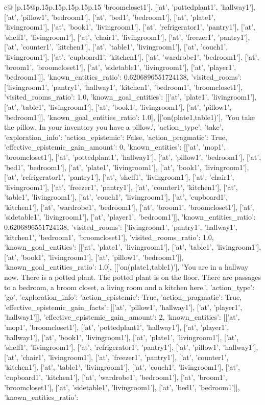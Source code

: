 \documentclass{article}
\begin{document}
{\begin{supertabular}{c@{$\;$}|p{.15\linewidth}@{}p{.15\linewidth}p{.15\linewidth}p{.15\linewidth}p{.15\linewidth}p{.15\linewidth}}
{{{'broomcloset1'], ['at', 'pottedplant1', 'hallway1'], ['at', 'pillow1', 'bedroom1'], ['at', 'bed1', 'bedroom1'], ['at', 'plate1', 'livingroom1'], ['at', 'book1', 'livingroom1'], ['at', 'refrigerator1', 'pantry1'], ['at', 'shelf1', 'livingroom1'], ['at', 'chair1', 'livingroom1'], ['at', 'freezer1', 'pantry1'], ['at', 'counter1', 'kitchen1'], ['at', 'table1', 'livingroom1'], ['at', 'couch1', 'livingroom1'], ['at', 'cupboard1', 'kitchen1'], ['at', 'wardrobe1', 'bedroom1'], ['at', 'broom1', 'broomcloset1'], ['at', 'sidetable1', 'livingroom1'], ['at', 'player1', 'bedroom1']], 'known_entities_ratio': 0.6206896551724138, 'visited_rooms': ['livingroom1', 'pantry1', 'hallway1', 'kitchen1', 'bedroom1', 'broomcloset1'], 'visited_rooms_ratio': 1.0, 'known_goal_entities': [['at', 'plate1', 'livingroom1'], ['at', 'table1', 'livingroom1'], ['at', 'book1', 'livingroom1'], ['at', 'pillow1', 'bedroom1']], 'known_goal_entities_ratio': 1.0}}], [['on(plate1,table1)'], 'You take the pillow. In your inventory you have a pillow.', {'action_type': 'take', 'exploration_info': {'action_epistemic': False, 'action_pragmatic': True, 'effective_epistemic_gain_amount': 0, 'known_entities': [['at', 'mop1', 'broomcloset1'], ['at', 'pottedplant1', 'hallway1'], ['at', 'pillow1', 'bedroom1'], ['at', 'bed1', 'bedroom1'], ['at', 'plate1', 'livingroom1'], ['at', 'book1', 'livingroom1'], ['at', 'refrigerator1', 'pantry1'], ['at', 'shelf1', 'livingroom1'], ['at', 'chair1', 'livingroom1'], ['at', 'freezer1', 'pantry1'], ['at', 'counter1', 'kitchen1'], ['at', 'table1', 'livingroom1'], ['at', 'couch1', 'livingroom1'], ['at', 'cupboard1', 'kitchen1'], ['at', 'wardrobe1', 'bedroom1'], ['at', 'broom1', 'broomcloset1'], ['at', 'sidetable1', 'livingroom1'], ['at', 'player1', 'bedroom1']], 'known_entities_ratio': 0.6206896551724138, 'visited_rooms': ['livingroom1', 'pantry1', 'hallway1', 'kitchen1', 'bedroom1', 'broomcloset1'], 'visited_rooms_ratio': 1.0, 'known_goal_entities': [['at', 'plate1', 'livingroom1'], ['at', 'table1', 'livingroom1'], ['at', 'book1', 'livingroom1'], ['at', 'pillow1', 'bedroom1']], 'known_goal_entities_ratio': 1.0}}], [['on(plate1,table1)'], 'You are in a hallway now. There is a potted plant. The potted plant is on the floor. There are passages to a bedroom, a broom closet, a living room and a kitchen here.', {'action_type': 'go', 'exploration_info': {'action_epistemic': True, 'action_pragmatic': True, 'effective_epistemic_gain_facts': [['at', 'pillow1', 'hallway1'], ['at', 'player1', 'hallway1']], 'effective_epistemic_gain_amount': 2, 'known_entities': [['at', 'mop1', 'broomcloset1'], ['at', 'pottedplant1', 'hallway1'], ['at', 'player1', 'hallway1'], ['at', 'book1', 'livingroom1'], ['at', 'plate1', 'livingroom1'], ['at', 'shelf1', 'livingroom1'], ['at', 'refrigerator1', 'pantry1'], ['at', 'pillow1', 'hallway1'], ['at', 'chair1', 'livingroom1'], ['at', 'freezer1', 'pantry1'], ['at', 'counter1', 'kitchen1'], ['at', 'table1', 'livingroom1'], ['at', 'couch1', 'livingroom1'], ['at', 'cupboard1', 'kitchen1'], ['at', 'wardrobe1', 'bedroom1'], ['at', 'broom1', 'broomcloset1'], ['at', 'sidetable1', 'livingroom1'], ['at', 'bed1', 'bedroom1']], 'known_entities_ratio': }}}
\end{supertabular}}
\end{document}
